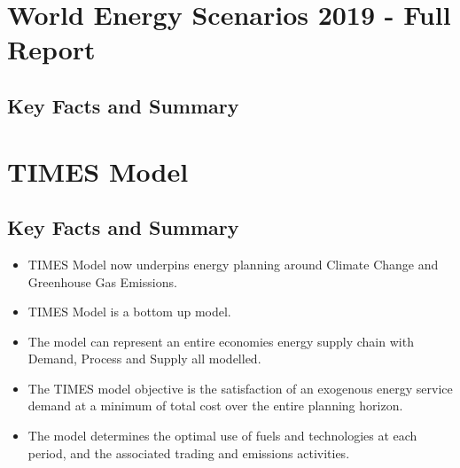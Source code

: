 \documentclass[12pt]{article}
\begin{document}
    \section{World Energy Scenarios 2019 - Full Report}
    \subsection{Key Facts and Summary}
    \section{TIMES Model}
    \subsection{Key Facts and Summary}
    \begin{itemize}
        \item TIMES Model now underpins energy planning around Climate Change and Greenhouse Gas Emissions.
        \item TIMES Model is a bottom up model.
        \item The model can represent an entire economies energy supply chain with Demand, Process and Supply all modelled.
        \item The TIMES model objective is the satisfaction of an exogenous energy service demand at a minimum of total cost over the entire planning horizon.
        \item The model determines the optimal use of fuels and technologies at each period, and the associated trading and emissions activities.
    \end{itemize}
\end{document}
